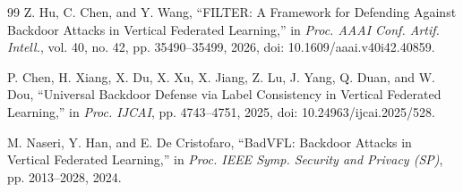 \documentclass[10pt, conference]{IEEEtran}
\begin{document}
\begin{thebibliography}{99}
Z. Hu, C. Chen, and Y. Wang,
``FILTER: A Framework for Defending Against Backdoor Attacks in Vertical Federated Learning,''
in \textit{Proc. AAAI Conf. Artif. Intell.}, vol. 40, no. 42,
pp. 35490--35499, 2026,
doi: 10.1609/aaai.v40i42.40859.

P. Chen, H. Xiang, X. Du, X. Xu, X. Jiang, Z. Lu, J. Yang,
Q. Duan, and W. Dou,
``Universal Backdoor Defense via Label Consistency in Vertical Federated Learning,''
in \textit{Proc. IJCAI}, pp. 4743--4751, 2025,
doi: 10.24963/ijcai.2025/528.

M. Naseri, Y. Han, and E. De Cristofaro,
``BadVFL: Backdoor Attacks in Vertical Federated Learning,''
in \textit{Proc. IEEE Symp. Security and Privacy (SP)},
pp. 2013--2028, 2024.

\end{thebibliography}
\end{document}
